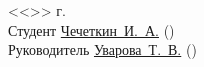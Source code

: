 \documentclass[a4paper, 14pt]{extreport}
\begin{document}
    \pagestyle{empty}
    \vspace{\fill}
    \noindent<<\underline{\hspace{1cm}}>> \underline{\hspace{5cm}} \the\year г.\\
    Студент \hspace{1cm} \underline{Чечеткин~И.~А.\hspace{2.85cm}} \hspace{2cm} (\underline{\hspace{5cm}})\\
    Руководитель \underline{Уварова~Т.~В.\hspace{3.25cm}} \hspace{2cm} (\underline{\hspace{5cm}})\\
\end{document}
